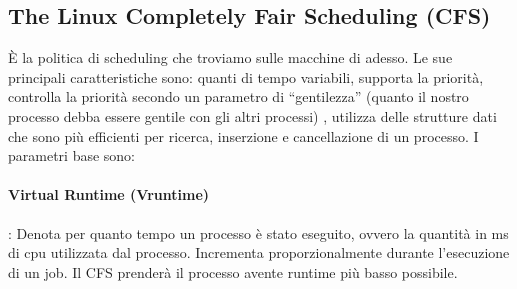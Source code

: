 \documentclass{article}
\begin{document}
\subsection{The Linux Completely Fair Scheduling (CFS)}
È la politica di scheduling che troviamo sulle macchine di adesso. Le sue principali caratteristiche sono: quanti di tempo variabili, supporta la priorità, controlla la priorità secondo un parametro di “gentilezza” (quanto il nostro processo debba essere gentile con gli altri processi) , utilizza delle strutture dati che sono più efficienti per ricerca, inserzione e cancellazione di un processo. I parametri base sono:\\
\paragraph{Virtual Runtime (Vruntime)}: Denota per quanto tempo un processo è stato eseguito, ovvero la quantità in ms di cpu utilizzata dal processo. Incrementa proporzionalmente durante l’esecuzione di un job. Il CFS prenderà il processo avente runtime più basso possibile.
\end{document}
